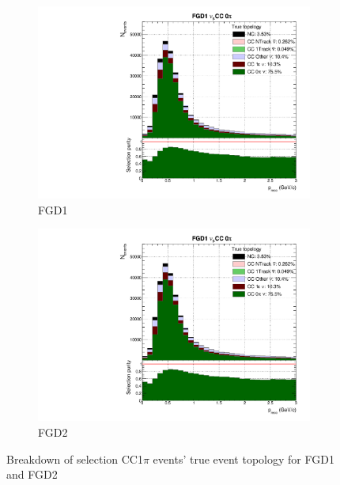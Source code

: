\begin{figure}[h]
	\begin{subfigure}[t]{0.49\textwidth}
		\includegraphics[width=\textwidth,page=3, trim={0mm 0mm 0mm 9mm}, clip]{figures/mach3/selection/2017b_Diag_WithSelection}
		\caption{FGD1}
	\end{subfigure}
	\begin{subfigure}[t]{0.49\textwidth}
		\includegraphics[width=\textwidth,page=9, trim={0mm 0mm 0mm 9mm}, clip]{figures/mach3/selection/2017b_Diag_WithSelection}
		\caption{FGD2}
	\end{subfigure}
	\caption{Breakdown of selection CC1$\pi$ events' true event topology for FGD1 and FGD2 }
	\label{fig:cc1pi_topology}
\end{figure}

